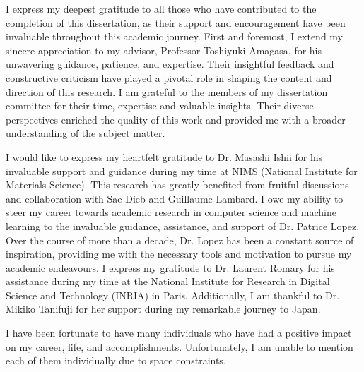 I express my deepest gratitude to all those who have contributed to the completion of this dissertation, as their support and encouragement have been invaluable throughout this academic journey.
First and foremost, I extend my sincere appreciation to my advisor, Professor Toshiyuki Amagasa, for his unwavering guidance, patience, and expertise. Their insightful feedback and constructive criticism have played a pivotal role in shaping the content and direction of this research.
I am grateful to the members of my dissertation committee for their time, expertise and valuable insights. Their diverse perspectives enriched the quality of this work and provided me with a broader understanding of the subject matter.

I would like to express my heartfelt gratitude to Dr. Masashi Ishii for his invaluable support and guidance during my time at NIMS (National Institute for Materials Science).
This research has greatly benefited from fruitful discussions and collaboration with Sae Dieb and Guillaume Lambard. 
I owe my ability to steer my career towards academic research in computer science and machine learning to the invaluable guidance, assistance, and support of Dr. Patrice Lopez. Over the course of more than a decade, Dr. Lopez has been a constant source of inspiration, providing me with the necessary tools and motivation to pursue my academic endeavours.
I express my gratitude to Dr. Laurent Romary for his assistance during my time at the National Institute for Research in Digital Science and Technology (INRIA) in Paris. Additionally, I am thankful to Dr. Mikiko Tanifuji for her support during my remarkable journey to Japan. 

I have been fortunate to have many individuals who have had a positive impact on my career, life, and accomplishments. Unfortunately, I am unable to mention each of them individually due to space constraints.